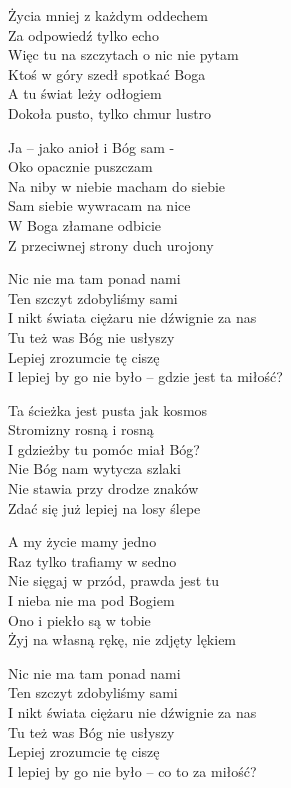 \begin{text}
    Życia mniej z każdym oddechem\\
    Za odpowiedź tylko echo\\
    Więc tu na szczytach o nic nie pytam\\
    Ktoś w góry szedł spotkać Boga\\
    A tu świat leży odłogiem\\
    Dokoła pusto, tylko chmur lustro

    Ja – jako anioł i Bóg sam -\\
    Oko opacznie puszczam\\
    Na niby w niebie macham do siebie\\
    Sam siebie wywracam na nice\\
    W Boga złamane odbicie\\
    Z przeciwnej strony duch urojony

    Nic nie ma tam ponad nami\\
    Ten szczyt zdobyliśmy sami\\
    I nikt świata ciężaru nie dźwignie za nas\\
    Tu też was Bóg nie usłyszy\\
    Lepiej zrozumcie tę ciszę\\
    I lepiej by go nie było – gdzie jest ta miłość?

    Ta ścieżka jest pusta jak kosmos\\
    Stromizny rosną i rosną\\
    I gdzieżby tu pomóc miał Bóg?\\
    Nie Bóg nam wytycza szlaki\\
    Nie stawia przy drodze znaków\\
    Zdać się już lepiej na losy ślepe

    A my życie mamy jedno\\
    Raz tylko trafiamy w sedno\\
    Nie sięgaj w przód, prawda jest tu\\
    I nieba nie ma pod Bogiem\\
    Ono i piekło są w tobie\\
    Żyj na własną rękę, nie zdjęty lękiem

    Nic nie ma tam ponad nami\\
    Ten szczyt zdobyliśmy sami\\
    I nikt świata ciężaru nie dźwignie za nas\\
    Tu też was Bóg nie usłyszy\\
    Lepiej zrozumcie tę ciszę\\
    I lepiej by go nie było – co to za miłość?
\end{text}
